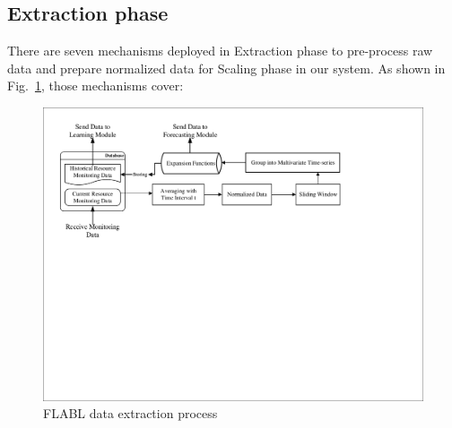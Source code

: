 \documentclass[runningheads]{llncs}
\begin{document}
\subsection{Extraction phase}
\label{extraction_phrase}

There are seven mechanisms deployed in Extraction phase to pre-process raw data and prepare normalized data for Scaling phase in our system. As shown in Fig.~\ref{FLABLextraction}, those mechanisms cover: 

\begin{figure}
	\begin{center}
		\includegraphics[width=0.9\textwidth =0cm 0cm 0cm 0cm, clip]{images/pdf/Extraction_Module.pdf}
		\caption{FLABL data extraction process}
		\label{FLABLextraction}
	\end{center}
\end{figure}
\end{document}
